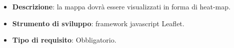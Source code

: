 \begin{itemize}
	\item \textbf{Descrizione}: la mappa dovrà essere visualizzati in forma di heat-map. %
	\item \textbf{Strumento di sviluppo}: framework javascript Leaflet.
	\item \textbf{Tipo di requisito}: Obbligatorio.
\end{itemize}

